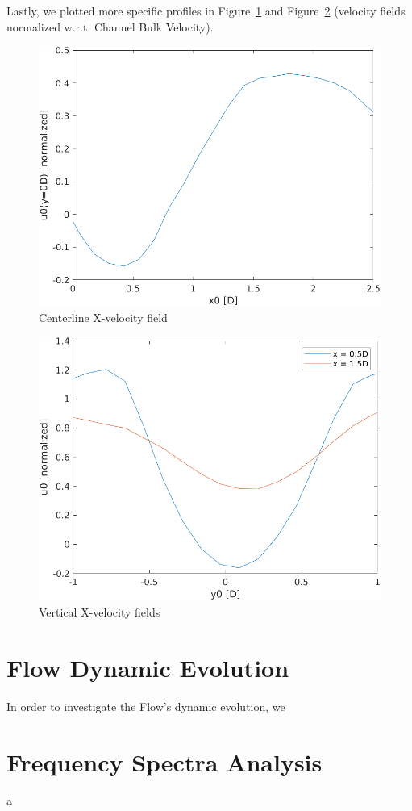 \documentclass[12pt]{article}
\begin{document}
        Lastly, we plotted more specific profiles in Figure~\ref{fig:centerline_average} and Figure~\ref{fig:vertical_profiles} (velocity fields normalized w.r.t. Channel Bulk Velocity).

        \begin{figure}[ht!]
                \centering
                \includegraphics[width=\textwidth]{Centerline_Profile.png}
                \caption{Centerline X-velocity field}
                \label{fig:centerline_average}
        \end{figure}

        \begin{figure}[ht!]
                \centering
                \includegraphics[width=\textwidth]{Vertical_Profiles.png}
                \caption{Vertical X-velocity fields}
                \label{fig:vertical_profiles}
        \end{figure}

\section{Flow Dynamic Evolution} \label{sec:dynamics}

        In order to investigate the Flow's dynamic evolution, we 

\section{Frequency Spectra Analysis} \label{sec:spectra}

        a



\end{document}
